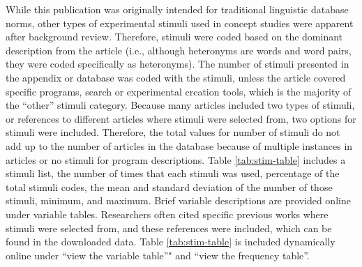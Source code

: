 \documentclass[english,,man]{apa6}
\theoremstyle{definition}
\theoremstyle{definition}
\theoremstyle{definition}
\theoremstyle{remark}
\begin{document}
While this publication was originally intended for traditional
linguistic database norms, other types of experimental stimuli used in
concept studies were apparent after background review. Therefore,
stimuli were coded based on the dominant description from the article
(i.e., although heteronyms are words and word pairs, they were coded
specifically as heteronyms). The number of stimuli presented in the
appendix or database was coded with the stimuli, unless the article
covered specific programs, search or experimental creation tools, which
is the majority of the \enquote{other} stimuli category. Because many
articles included two types of stimuli, or references to different
articles where stimuli were selected from, two options for stimuli were
included. Therefore, the total values for number of stimuli do not add
up to the number of articles in the database because of multiple
instances in articles or no stimuli for program descriptions. Table
\ref{tab:stim-table} includes a stimuli list, the number of times that
each stimuli was used, percentage of the total stimuli codes, the mean
and standard deviation of the number of those stimuli, minimum, and
maximum. Brief variable descriptions are provided online under variable
tables. Researchers often cited specific previous works where stimuli
were selected from, and these references were included, which can be
found in the downloaded data. Table \ref{tab:stim-table} is included
dynamically online under \enquote{view the variable table}" and
\enquote{view the frequency table}.
\end{document}
